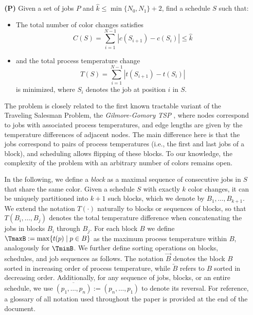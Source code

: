 \documentclass{article}
\theoremstyle{definition}
\newcommand{\setJ}{P}
\newcommand{\numJ}{N}
\newcommand{\sched}{S}
\newcommand{\block}{B}
\newcommand{\job}{p}
\newcommand{\temp}{T}
\newcommand{\tempJ}{t}
\newcommand{\col}{C}
\newcommand{\colJ}{c}
\begin{document}
    \textbf{(P)} Given a set of jobs $\setJ$ and $\hat{k} \leq \min\{\numJ_0, \numJ_1\}+2$, find a schedule $\sched$ such that:
    \begin{itemize}
        \item The total number of color changes satisfies
        \[
        \col(\sched) = \sum_{i=1}^{N-1}|\colJ(\sched_{i+1})-\colJ(\sched_i)| \leq \hat{k}
        \]
        \item and the total process temperature change
        \[
        \temp(\sched) = \sum_{i=1}^{N-1}|\tempJ(\sched_{i+1}) - \tempJ(\sched_i)|
        \]
        is minimized, where $\sched_i$ denotes the job at position $i$ in $\sched$.
    \end{itemize}

The problem is closely related to the first known tractable variant of the Traveling Salesman Problem, the \emph{Gilmore-Gomory TSP} \cite{gilmore1964}, where nodes correspond to jobs with associated process temperatures, and edge lengths are given by the temperature differences of adjacent nodes. The main difference here is that the jobs correspond to pairs of process temperatures (i.e., the first and last jobs of a block), and scheduling allows flipping of these blocks. To our knowledge, the complexity of the problem with an arbitrary number of colors remains open.

In the following, we define a \emph{block} as a maximal sequence of consecutive jobs in $\sched$ that share the same color. Given a schedule $\sched$ with exactly $k$ color changes, it can be uniquely partitioned into $k+1$ such blocks, which we denote by $\block_1, \ldots, \block_{k+1}$.
We extend the notation $\temp(\cdot)$ naturally to blocks or sequences of blocks, so that $\temp(\block_i,\ldots,\block_j)$ denotes the total temperature difference when concatenating the jobs in blocks $\block_i$ through $\block_j$. For each block $B$ we define $\TmaxB := \max\{\tempJ(\job) \mid \job \in \block\}$ as the maximum process temperature within $B$, analogously for $\TminB$. We further define sorting operations on blocks, schedules, and job sequences as follows. The notation $\overrightarrow{B}$ denotes the block $B$ sorted in increasing order of process temperature, while $\overleftarrow{B}$ refers to $B$ sorted in decreasing order. Additionally, for any sequence of jobs, blocks, or an entire schedule, we use $\overline{(p_1, \ldots, p_n)} := (p_n, \ldots, p_1)$ to denote its reversal. For reference, a glossary of all notation used throughout the paper is provided at the end of the document.
\end{document}
